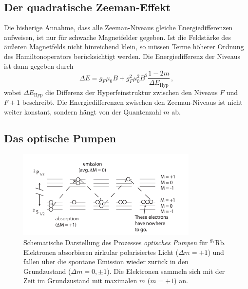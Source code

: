 \subsection{Der quadratische Zeeman-Effekt}
Die bisherige Annahme, dass alle Zeeman-Niveaus gleiche Energiedifferenzen aufweisen, ist nur für schwache Magnetfelder gegeben.
Ist die Feldstärke des äußeren Magnetfelds nicht hinreichend klein, so müssen Terme höherer Ordnung des Hamiltonoperators berücksichtigt werden.
Die Energiedifferenz der Niveaus ist dann gegeben durch
\begin{equation}
    \Delta E = g_F \mu_0 B + g_F^2 \mu_0^2 B^2 \frac{1-2m}{\Delta E_\text{Hyp}} \, ,
\end{equation}
wobei $\Delta E_\text{Hyp}$ die Differenz der Hyperfeinstruktur zwischen den Niveaus $F$ und $F+1$ beschreibt.
Die Energiedifferenzen zwischen den Zeeman-Niveaus ist nicht weiter konstant, sondern hängt von der Quantenzahl $m$ ab.

\subsection{Das optische Pumpen}



\begin{figure}
    \centering
    \includegraphics[width=0.8\textwidth]{content/img/optisches_pumpen.png}
    \caption{Schematische Darstellung des Prozesses \textit{optisches Pumpen} für $^{87}\text{Rb}$.
    Elektronen absorbieren zirkular polarisiertes Licht ($\Delta m = +1$) und 
    fallen über die spontane Emission wieder zurück in den Grundzustand ($\Delta m = 0, \pm 1$).
    Die Elektronen sammeln sich mit der Zeit im Grundzustand mit maximalen $m$ ($m=+1$) an.
    }
    \label{fig:optisches_pumpen}
\end{figure}